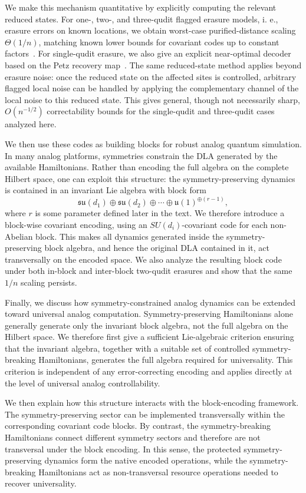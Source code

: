 \documentclass[10pt,twocolumn,superscriptaddress,aps,amsmath,amssymb,citeautoscript,floatfix,prx,longbibliography]{revtex4-2}
\newcounter{alg}
\theoremstyle{plain}
\theoremstyle{plain}
\theoremstyle{plain}
\theoremstyle{plain}
\theoremstyle{plain}
\theoremstyle{plain}
\begin{document}
We make this mechanism quantitative by explicitly computing the relevant reduced states. For one-, two-, and three-qudit flagged erasure models, i. e., erasure errors on known locations, we obtain worst-case purified-distance scaling $\Theta(1/n)$, matching known lower bounds for covariant codes up to constant factors~\cite{Faist2020,Zhou2021}. For single-qudit erasure, we also give an explicit near-optimal decoder based on the Petz recovery map~\cite{Petz1988, Barnum2002, Ng2010}. The same reduced-state method applies beyond erasure noise: once the reduced state on the affected sites is controlled, arbitrary flagged local noise can be handled by applying the complementary channel of the local noise to this reduced state. This gives general, though not necessarily sharp, $O(n^{-1/2})$ correctability bounds for the single-qudit and three-qudit cases analyzed here.

We then use these codes as building blocks for robust analog quantum simulation. In many analog platforms, symmetries constrain the DLA generated by the available Hamiltonians. Rather than encoding the full algebra on the complete Hilbert space, one can exploit this structure: the symmetry-preserving dynamics is contained in an invariant Lie algebra with block form
$$
\mathfrak{su}(d_1)\oplus\mathfrak{su}(d_2)\oplus\cdots
\oplus \mathfrak{u}(1)^{\oplus(r-1)},
$$
where $r$ is some parameter defined later in the text. We therefore introduce a block-wise covariant encoding, using an $SU(d_i)$-covariant code for each non-Abelian block. This makes all dynamics generated inside the symmetry-preserving block algebra, and hence the original DLA contained in it, act transversally on the encoded space. We also analyze the resulting block code under both in-block and inter-block two-qudit erasures and show that the same $1/n$ scaling persists.

Finally, we discuss how symmetry-constrained analog dynamics can be extended toward universal analog computation. Symmetry-preserving Hamiltonians alone generally generate only the invariant block algebra, not the full algebra on the Hilbert space. We therefore first give a sufficient Lie-algebraic criterion ensuring that the invariant algebra, together with a suitable set of controlled symmetry-breaking Hamiltonians, generates the full algebra required for universality. This criterion is independent of any error-correcting encoding and applies directly at the level of universal analog controllability.

We then explain how this structure interacts with the block-encoding framework. The symmetry-preserving sector can be implemented transversally within the corresponding covariant code blocks. By contrast, the symmetry-breaking Hamiltonians connect different symmetry sectors and therefore are not transversal under the block encoding. In this sense, the protected symmetry-preserving dynamics form the native encoded operations, while the symmetry-breaking Hamiltonians act as non-transversal resource operations needed to recover universality.
\end{document}
